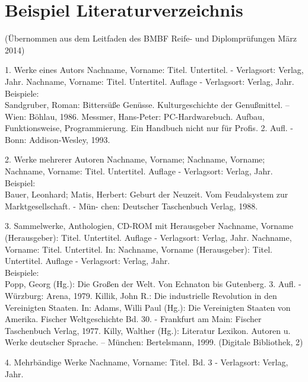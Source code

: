 \documentclass[12pt,a4paper]{article}
\newcommand{\yhbu}[0]{\color{ydkbu}}	%
\begin{document}
\section*{Beispiel Literaturverzeichnis}
	{\fontsize{10pt}{10pt}\selectfont
	(Übernommen aus dem Leitfaden des BMBF Reife- und Diplomprüfungen März 2014)
	\\[0mm]
	\begin{description*}
	\item[1. Werke eines Autors] Nachname, Vorname: Titel. Untertitel. -
		Verlagsort: Verlag, Jahr. Nachname,
		Vorname: Titel. Untertitel. Auflage - Verlagsort: Verlag, Jahr.
		\\[1mm]Beispiele:
		\\Sandgruber, Roman: Bittersüße Genüsse. Kulturgeschichte der Genußmittel. – Wien:
		Böhlau, 1986. Messmer, Hans-Peter: PC-Hardwarebuch. Aufbau, Funktionsweise,
		Programmierung. Ein Handbuch nicht nur für Profis. 2. Aufl. - Bonn: Addison-Wesley,
		1993.
		\vspace*{2mm}
	\item[2. Werke mehrerer Autoren] Nachname, Vorname; Nachname, Vorname; Nachname, Vorname: Titel.
		Untertitel. Auflage - Verlagsort: Verlag, Jahr.
		\\[1mm]Beispiel:
		\\Bauer, Leonhard; Matis, Herbert: Geburt der Neuzeit. Vom Feudalsystem zur
		Marktgesellschaft. - Mün- chen: Deutscher Taschenbuch Verlag, 1988.
		\vspace*{2mm}
	\item[3. Sammelwerke, Anthologien, CD-ROM mit Herausgeber] Nachname, Vorname (Herausgeber):
		Titel. Untertitel. Auflage - Verlagsort: Verlag, Jahr. Nachname, Vorname: Titel.
		Untertitel. In: Nachname, Vorname (Herausgeber): Titel. Untertitel. Auflage -
		Verlagsort: Verlag, Jahr.
		\\[1mm]Beispiele:
		\\Popp, Georg (Hg.): Die Großen der Welt. Von Echnaton bis Gutenberg. 3. Aufl. -
		Würzburg: Arena, 1979. Killik, John R.: Die industrielle Revolution in den Vereinigten
		Staaten. In: Adams, Willi Paul (Hg.): Die Vereinigten Staaten von Amerika. Fischer
		Weltgeschichte Bd. 30. - Frankfurt am Main: Fischer Taschenbuch Verlag, 1977. Killy,
		Walther (Hg.): Literatur Lexikon. Autoren u. Werke deutscher Sprache. – München:
		Bertelsmann, 1999. (Digitale Bibliothek, 2)
		\vspace*{2mm}
	\item[4. Mehrbändige Werke] Nachname, Vorname: Titel. Bd. 3 - Verlagsort: Verlag, Jahr.

\end{description*}}
\end{document}
